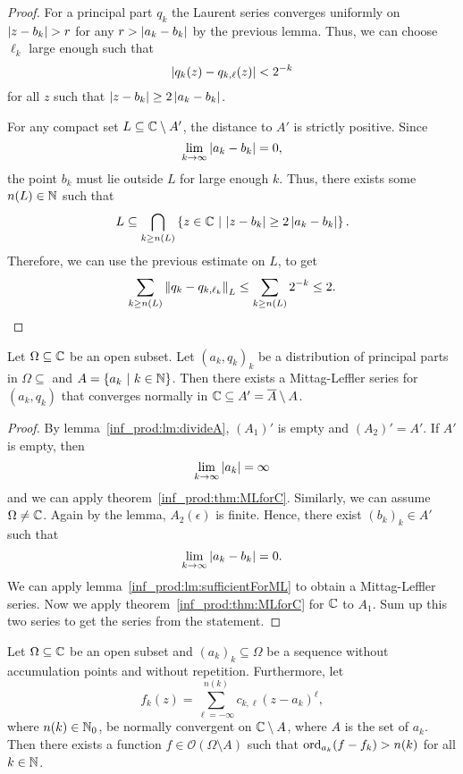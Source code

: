 \begin{proof}
For a principal part $q_k$ the Laurent series converges uniformly
on $\left\lvert z - b_k\right\rvert > r$ for any $r > \left\lvert a_k - b_k\right\rvert$ by the
previous lemma. Thus, we can choose $\ell_k$ large enough such that
\[
\left\lvert q_k(z) - q_{k, \ell}(z)\right\rvert < 2^{-k}
\]
for all $z$ such that $\left\lvert z - b_k\right\rvert \geq 2 \left\lvert a_k - b_k\right\rvert$.

For any compact set $L \subseteq \mathbb{C} \setminus A'$, the distance to
$A'$ is strictly positive. Since
\[
\lim_{k \to \infty} \left\lvert a_k - b_k\right\rvert = 0,
\]
the point $b_k$ must lie outside $L$ for large enough $k$. Thus,
there exists some $n(L) \in \mathbb{N}$ such that
\[
L \subseteq
\bigcap_{k \geq n(L)}
\left\{z \in \mathbb{C}~\middle\vert~\left\lvert z - b_k\right\rvert \geq 2 \left\lvert a_k - b_k\right\rvert\right\}.
\]
Therefore, we can use the previous estimate on $L$, to get 
\[
\sum_{k \geq n(L)} \left\lVert q_k - q_{k, \ell_k}\right\rVert_L \leq
\sum_{k \geq n(L)} 2^{- k} \leq
2. \qedhere
\]
\end{proof}

\begin{izrek}
\label{inf_prod:lm:MLTOpen}
Let $\Omega \subseteq \mathbb{C}$ be an open subset. Let $(a_k, q_k)_k$ be
a distribution of principal parts in $\Omega \subseteq$ and
$A = \left\{a_k~\middle\vert~k \in \mathbb{N}\right\}$. Then there exists a Mittag-Leffler
series for $(a_k, q_k)$ that converges normally in
$\mathbb{C} \subseteq A' = \overline{A} \setminus A$.
\end{izrek}

\begin{proof}
By lemma~\ref{inf_prod:lm:divideA}, $(A_1)'$ is empty and
$(A_2)' = A'$. If $A'$ is empty, then
\[
\lim_{k \to \infty} \left\lvert a_k\right\rvert = \infty
\]
and we can apply theorem~\ref{inf_prod:thm:MLforC}. Similarly, we
can assume $\Omega \neq \mathbb{C}$. Again by the lemma, $A_2(\epsilon)$ is
finite. Hence, there exist $(b_k)_k \in A'$ such that
\[
\lim_{k \to \infty} \left\lvert a_k - b_k\right\rvert = 0.
\]
We can apply lemma~\ref{inf_prod:lm:sufficientForML} to obtain a
Mittag-Leffler series. Now we apply
theorem~\ref{inf_prod:thm:MLforC} for $\mathbb{C}$ to $A_1$. Sum up this
two series to get the series from the statement.
\end{proof}

\begin{izrek}
\label{inf_prod:thm:MLOsculation}
Let $\Omega \subseteq \mathbb{C}$ be an open subset and
$(a_k)_k \subseteq \Omega$ be a sequence without accumulation
points and without repetition. Furthermore, let
\[
f_k(z) =
\sum_{\ell=-\infty}^{n(k)} c_{k, \ell}(z - a_k)^\ell,
\]
where $n(k) \in \mathbb{N}_0$, be normally convergent on $\mathbb{C} \setminus A$,
where $A$ is the set of $a_k$. Then there exists a function
$f \in \mathcal{O}(\Omega \setminus A)$ such that
$\operatorname{ord}_{a_k}(f - f_k) > n(k)$ for all $k \in \mathbb{N}$.
\end{izrek}

